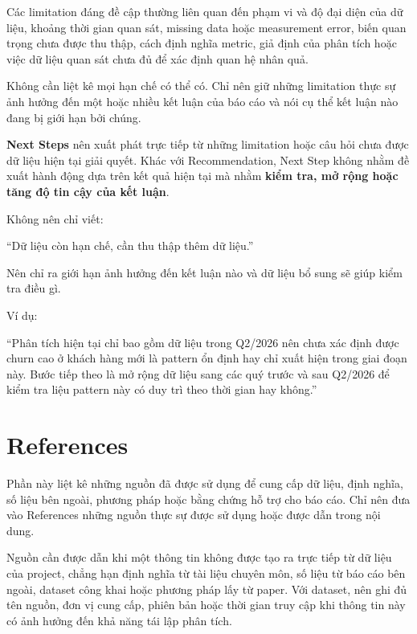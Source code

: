 \documentclass[12pt]{eDA_conquer2026}
\begin{document}
Các limitation đáng đề cập thường liên quan đến phạm vi và độ đại diện của dữ liệu, khoảng thời gian quan sát, missing data hoặc measurement error, biến quan trọng chưa được thu thập, cách định nghĩa metric, giả định của phân tích hoặc việc dữ liệu quan sát chưa đủ để xác định quan hệ nhân quả.

Không cần liệt kê mọi hạn chế có thể có. Chỉ nên giữ những limitation thực sự ảnh hưởng đến một hoặc nhiều kết luận của báo cáo và nói cụ thể kết luận nào đang bị giới hạn bởi chúng.

\textbf{Next Steps} nên xuất phát trực tiếp từ những limitation hoặc câu hỏi chưa được dữ liệu hiện tại giải quyết. Khác với Recommendation, Next Step không nhằm đề xuất hành động dựa trên kết quả hiện tại mà nhằm \textbf{kiểm tra, mở rộng hoặc tăng độ tin cậy của kết luận}.

\begin{aivncodebox}
Không nên chỉ viết:

``Dữ liệu còn hạn chế, cần thu thập thêm dữ liệu.''

Nên chỉ ra giới hạn ảnh hưởng đến kết luận nào và dữ liệu bổ sung sẽ giúp kiểm tra điều gì.

Ví dụ:

``Phân tích hiện tại chỉ bao gồm dữ liệu trong Q2/2026 nên chưa xác định được churn cao ở khách hàng mới là pattern ổn định hay chỉ xuất hiện trong giai đoạn này. Bước tiếp theo là mở rộng dữ liệu sang các quý trước và sau Q2/2026 để kiểm tra liệu pattern này có duy trì theo thời gian hay không.''
\end{aivncodebox}


\newpage
\newpage
\section{References}
\label{section:references}

Phần này liệt kê những nguồn đã được sử dụng để cung cấp dữ liệu, định nghĩa, số liệu bên ngoài, phương pháp hoặc bằng chứng hỗ trợ cho báo cáo. Chỉ nên đưa vào References những nguồn thực sự được sử dụng hoặc được dẫn trong nội dung.

Nguồn cần được dẫn khi một thông tin không được tạo ra trực tiếp từ dữ liệu của project, chẳng hạn định nghĩa từ tài liệu chuyên môn, số liệu từ báo cáo bên ngoài, dataset công khai hoặc phương pháp lấy từ paper. Với dataset, nên ghi đủ tên nguồn, đơn vị cung cấp, phiên bản hoặc thời gian truy cập khi thông tin này có ảnh hưởng đến khả năng tái lập phân tích.
\end{document}
